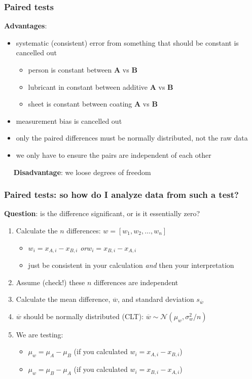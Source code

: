 \begin{frame}\frametitle{Paired tests}

	\textbf{Advantages}:
	\begin{itemize}
		\item	systematic (consistent) error from something that should be constant is cancelled out
		\begin{itemize}
			\item	person is constant between \textbf{A} vs \textbf{B}
			\item	lubricant in constant between additive \textbf{A} vs \textbf{B}
			\item	sheet is constant between coating \textbf{A} vs \textbf{B}
		\end{itemize}
		\item	measurement bias is cancelled out
		\item	only the paired differences must be normally distributed, not the raw data
		\item	we only have to ensure the pairs are independent of each other
	\end{itemize}

	$\quad$ \textbf{Disadvantage}: we loose degrees of freedom
\end{frame}

\begin{frame}\frametitle{Paired tests: so how do I analyze data from such a test?}

	\textbf{Question}: is the difference significant, or is it essentially zero?
	\begin{enumerate}
		\item	Calculate the $n$ differences: $w = [w_1, w_2, \ldots, w_n]$
		\begin{itemize}
			\item	$w_i = x_{A,i} - x_{B,i}$  \qquad\emph{or}\qquad $w_i = x_{B,i} - x_{A,i}$
			\item	just be consistent in your calculation \emph{and} then your interpretation
		\end{itemize}
		\item	Assume (check!) these $n$ differences are independent
		\item	Calculate the mean difference, $\overline{w}$, and standard deviation $s_{\overline{w}}$
		\item	$\overline{w}$ should be normally distributed (CLT): $\overline{w} \sim \mathcal{N}\left(\mu_w, \sigma_w^2/n \right)$
		\item	We are testing:
		\begin{itemize}
			\item	$\mu_w = \mu_A - \mu_B$  (if you calculated $w_i = x_{A,i} - x_{B,i}$)
			\item	$\mu_w = \mu_B - \mu_A$  (if you calculated $w_i = x_{B,i} - x_{A,i}$)
		\end{itemize}
	\end{enumerate}
\end{frame}

